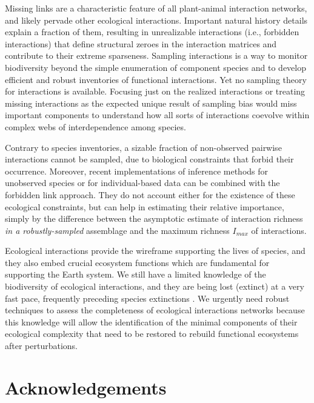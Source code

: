 \documentclass[12pt]{article}
\begin{document}
Missing links are a characteristic feature of all plant-animal interaction networks, and likely pervade other ecological interactions. Important natural history details explain a fraction of them, resulting in unrealizable interactions (i.e., forbidden interactions) that define structural zeroes in the interaction matrices and contribute to their extreme sparseness. Sampling interactions is a way to monitor biodiversity beyond the simple enumeration of component species and to develop efficient and robust inventories of functional interactions. Yet no sampling theory for interactions is available. Focusing just on the realized interactions or treating missing interactions as the expected unique result of sampling bias would miss important components to understand how all sorts of interactions coevolve within complex webs of interdependence among species. 

Contrary to species inventories, a sizable fraction of non-observed pairwise interactions cannot be sampled, due to biological constraints that forbid their occurrence. Moreover, recent implementations of inference methods for unobserved species \citep{Chao:2015tc} or for individual-based data \citep{Wells:2012dy} can be combined with the forbidden link approach. They do not account either for the existence of these ecological constraints, but can help in estimating their relative importance, simply by the difference between the asymptotic estimate of interaction richness \emph{in a robustly-sampled} assemblage and the maximum richness $I_{max}$ of interactions. 

Ecological interactions provide the wireframe supporting the lives of species, and they also embed crucial ecosystem functions which are fundamental for supporting the Earth system. We still have a limited knowledge of the biodiversity of ecological interactions, and they are being lost (extinct) at a very fast pace, frequently preceding species extinctions \citep{ValienteBanuet:2014bw}. We urgently need robust techniques to assess the completeness of ecological interactions networks because this knowledge will allow the identification of the minimal components of their ecological complexity that need to be restored to rebuild functional ecosystems after perturbations.

\section*{Acknowledgements}
\label{acknowledgements.}
\end{document}
